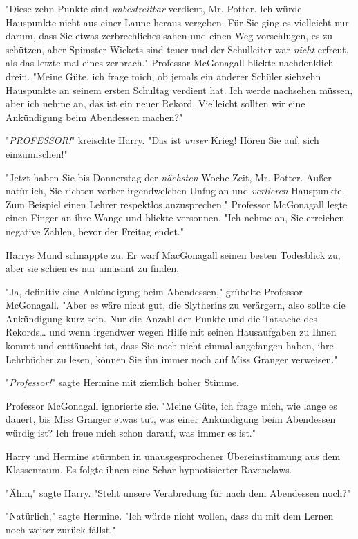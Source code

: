 {"Diese zehn Punkte sind \emph{unbestreitbar} verdient, Mr. Potter. Ich würde Hauspunkte nicht aus einer Laune heraus vergeben. Für Sie ging es vielleicht nur darum, dass Sie etwas zerbrechliches sahen und einen Weg vorschlugen, es zu schützen, aber Spimster Wickets sind teuer und der Schulleiter war \emph{nicht} erfreut, als das letzte mal eines zerbrach." Professor McGonagall blickte nachdenklich drein. "Meine Güte, ich frage mich, ob jemals ein anderer Schüler siebzehn Hauspunkte an seinem ersten Schultag verdient hat. Ich werde nachsehen müssen, aber ich nehme an, das ist ein neuer Rekord. Vielleicht sollten wir eine Ankündigung beim Abendessen machen?"

"\emph{PROFESSOR!}" kreischte Harry. "Das ist \emph{unser} Krieg! Hören Sie auf, sich einzumischen!"

"Jetzt haben Sie bis Donnerstag der \emph{nächsten} Woche Zeit, Mr. Potter. Außer natürlich, Sie richten vorher irgendwelchen Unfug an und \emph{verlieren} Hauspunkte. Zum Beispiel einen Lehrer respektlos anzusprechen." Professor McGonagall legte einen Finger an ihre Wange und blickte versonnen. "Ich nehme an, Sie erreichen negative Zahlen, bevor der Freitag endet."

Harrys Mund schnappte zu. Er warf MacGonagall seinen besten Todesblick zu, aber sie schien es nur amüsant zu finden.

"Ja, definitiv eine Ankündigung beim Abendessen," grübelte Professor McGonagall. "Aber es wäre nicht gut, die Slytherins zu verärgern, also sollte die Ankündigung kurz sein. Nur die Anzahl der Punkte und die Tatsache des Rekords… und wenn irgendwer wegen Hilfe mit seinen Hausaufgaben zu Ihnen kommt und enttäuscht ist, dass Sie noch nicht einmal angefangen haben, ihre Lehrbücher zu lesen, können Sie ihn immer noch auf Miss Granger verweisen."

"\emph{Professor!}" sagte Hermine mit ziemlich hoher Stimme.

Professor McGonagall ignorierte sie. "Meine Güte, ich frage mich, wie lange es dauert, bis Miss Granger etwas tut, was einer Ankündigung beim Abendessen würdig ist? Ich freue mich schon darauf, was immer es ist."

Harry und Hermine stürmten in unausgesprochener Übereinstimmung aus dem Klassenraum. Es folgte ihnen eine Schar hypnotisierter Ravenclaws.

"Ähm," sagte Harry. "Steht unsere Verabredung für nach dem Abendessen noch?"

"Natürlich," sagte Hermine. "Ich würde nicht wollen, dass du mit dem Lernen noch weiter zurück fällst."

}
